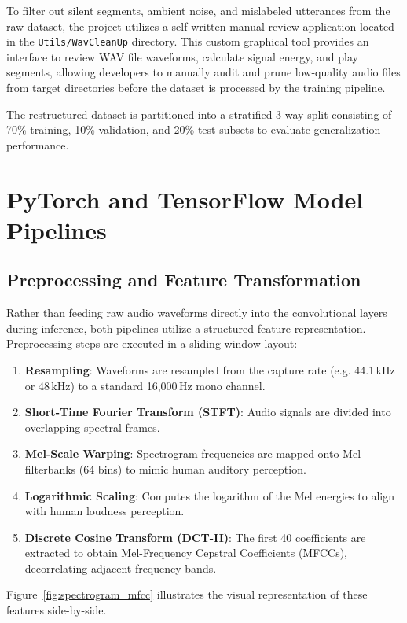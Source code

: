 \documentclass[11pt,a4paper]{article}
\begin{document}
To filter out silent segments, ambient noise, and mislabeled utterances from the raw dataset, the project utilizes a self-written manual review application located in the \texttt{Utils/WavCleanUp} directory. This custom graphical tool provides an interface to review WAV file waveforms, calculate signal energy, and play segments, allowing developers to manually audit and prune low-quality audio files from target directories before the dataset is processed by the training pipeline.

The restructured dataset is partitioned into a stratified 3-way split consisting of 70\% training, 10\% validation, and 20\% test subsets to evaluate generalization performance.

\newpage
\section{PyTorch and TensorFlow Model Pipelines}

\subsection{Preprocessing and Feature Transformation}
Rather than feeding raw audio waveforms directly into the convolutional layers during inference, both pipelines utilize a structured feature representation. Preprocessing steps are executed in a sliding window layout:
\begin{enumerate}
    \item \textbf{Resampling}: Waveforms are resampled from the capture rate (e.g. 44.1\,kHz or 48\,kHz) to a standard 16,000\,Hz mono channel.
    \item \textbf{Short-Time Fourier Transform (STFT)}: Audio signals are divided into overlapping spectral frames.
    \item \textbf{Mel-Scale Warping}: Spectrogram frequencies are mapped onto Mel filterbanks (64 bins) to mimic human auditory perception.
    \item \textbf{Logarithmic Scaling}: Computes the logarithm of the Mel energies to align with human loudness perception.
    \item \textbf{Discrete Cosine Transform (DCT-II)}: The first 40 coefficients are extracted to obtain Mel-Frequency Cepstral Coefficients (MFCCs), decorrelating adjacent frequency bands.
\end{enumerate}

Figure~\ref{fig:spectrogram_mfcc} illustrates the visual representation of these features side-by-side.
\end{document}
